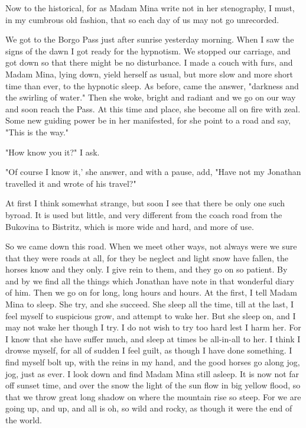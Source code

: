 Now to the historical, for as Madam Mina write not in her stenography, I must, in my cumbrous old fashion, that so each day of us may not go unrecorded. 

We got to the Borgo Pass just after sunrise yesterday morning. When I saw the signs of the dawn I got ready for the hypnotism. We stopped our carriage, and got down so that there might be no disturbance. I made a couch with furs, and Madam Mina, lying down, yield herself as usual, but more slow and more short time than ever, to the hypnotic sleep. As before, came the answer, "darkness and the swirling of water." Then she woke, bright and radiant and we go on our way and soon reach the Pass. At this time and place, she become all on fire with zeal. Some new guiding power be in her manifested, for she point to a road and say, "This is the way." 

"How know you it?" I ask. 

"Of course I know it,' she answer, and with a pause, add, "Have not my Jonathan travelled it and wrote of his travel?" 

At first I think somewhat strange, but soon I see that there be only one such byroad. It is used but little, and very different from the coach road from the Bukovina to Bistritz, which is more wide and hard, and more of use. 

So we came down this road. When we meet other ways, not always were we sure that they were roads at all, for they be neglect and light snow have fallen, the horses know and they only. I give rein to them, and they go on so patient. By and by we find all the things which Jonathan have note in that wonderful diary of him. Then we go on for long, long hours and hours. At the first, I tell Madam Mina to sleep. She try, and she succeed. She sleep all the time, till at the last, I feel myself to suspicious grow, and attempt to wake her. But she sleep on, and I may not wake her though I try. I do not wish to try too hard lest I harm her. For I know that she have suffer much, and sleep at times be all-in-all to her. I think I drowse myself, for all of sudden I feel guilt, as though I have done something. I find myself bolt up, with the reins in my hand, and the good horses go along jog, jog, just as ever. I look down and find Madam Mina still asleep. It is now not far off sunset time, and over the snow the light of the sun flow in big yellow flood, so that we throw great long shadow on where the mountain rise so steep. For we are going up, and up, and all is oh, so wild and rocky, as though it were the end of the world. 

